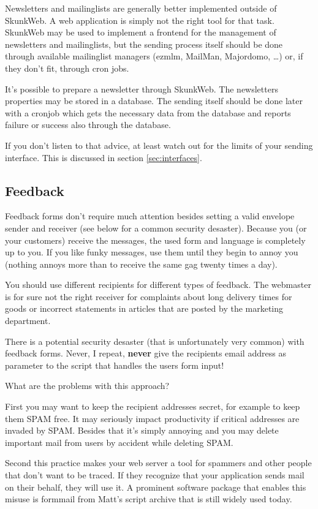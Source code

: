 \documentclass{article}
\begin{document}
Newsletters and mailinglists are generally better implemented outside
of SkunkWeb. A web application is simply not the right tool for that
task. SkunkWeb may be used to implement a frontend for the management
of newsletters and mailinglists, but the sending process itself should
be done through available mailinglist managers (ezmlm, MailMan,
Majordomo, \ldots) or, if they don't fit, through cron jobs.

It's possible to prepare a newsletter through SkunkWeb. The newsletters
properties may be stored in a database. The sending itself should be done
later with a cronjob which gets the necessary data from the database
and reports failure or success also through the database.

If you don't listen to that advice, at least watch out for the limits
of your sending interface. This is discussed in section
\ref{sec:interfaces}.

\subsection{Feedback}

Feedback forms don't require much attention besides setting a valid
envelope sender and receiver (see below for a common security desaster).
Because you (or your customers) receive
the messages, the used form and language is completely up to you.
If you like funky messages, use them until they begin to annoy you
(nothing annoys more than to receive the same gag twenty times a day).

You should use different recipients for different types of feedback.
The webmaster is for sure not the right receiver for complaints about
long delivery times for goods or incorrect statements in articles that
are posted by the marketing department.

There is a potential security desaster (that is unfortunately very common)
with feedback forms. Never, I repeat, \textbf{never} give the recipients
email address as parameter to the script that handles the users form
input!

What are the problems with this approach? 

First you may want to keep the recipient addresses secret, for example
to keep them SPAM free. It may seriously impact productivity if critical
addresses are invaded by SPAM. Besides that it's simply annoying and you
may delete important mail from users by accident while deleting SPAM.

Second this practice makes your web server a tool for spammers and
other people that don't want to be traced. If they recognize that your
application sends mail on their behalf, they will use it. A prominent
software package that enables this misuse is formmail from Matt's script
archive that is still widely used today.
\end{document}
